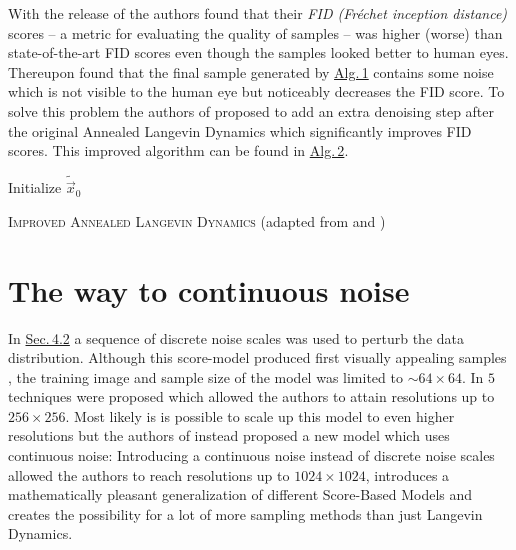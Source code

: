 With the release of \cite{score_1} the authors found that their \textit{FID (Fréchet inception distance)} \cite{fid} scores – a metric for evaluating the quality of samples – was higher (worse) than state-of-the-art FID scores even though the samples looked better to human eyes. Thereupon \cite{score_4} found that the final sample generated by \hyperref[alg:1]{Alg.\,1} contains some noise which is not visible to the human eye but noticeably decreases the FID score. To solve this problem the authors of \cite{score_4} proposed to add an extra denoising step after the original Annealed Langevin Dynamics which significantly improves FID scores. This improved algorithm can be found in \hyperref[alg:2]{Alg.\,2}.
%
\begin{algorithm} \label{alg:2}
    \DontPrintSemicolon
    Initialize $\tilde{\vec{x}}_0$\;
    
    \caption[Improved Annealed Langevin Dynamics]{\textsc{Improved Annealed Langevin Dynamics} (adapted from \cite{score_1} and \cite{score_4})}
\end{algorithm}
\section[The way to continuous noise]{The way to continuous noise%
    } \label{sec:4.4}
In \hyperref[sec:4.2]{Sec.\,4.2} a sequence of discrete noise scales was used to perturb the data distribution. Although this score-model produced first visually appealing samples \cite{score_1}, the training image and sample size of the model was limited to $\sim64\times64$. In \cite{score_2} $5$ techniques were proposed which allowed the authors to attain resolutions up to $256\times256$. Most likely is is possible to scale up this model to even higher resolutions but the authors of \cite{score_3} instead proposed a new model which uses continuous noise: Introducing a continuous noise \cite{score_3} instead of discrete noise scales allowed the authors to reach resolutions up to $1024\times1024$, introduces a mathematically pleasant generalization of different Score-Based Models and creates the possibility for a lot of more sampling methods than just Langevin Dynamics.
%
